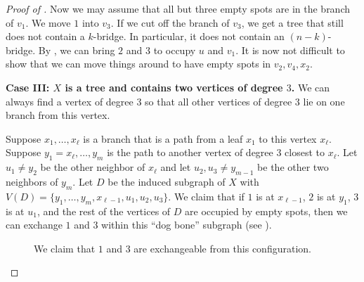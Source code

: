 \documentclass{mystyle}
\begin{document}
\begin{proof}[Proof of ]
    Now we may assume that all but three empty spots are in the branch of $v_1$. We move $1$ into $v_3$. If we cut off the branch of $v_3$, we get a tree that still does not contain a $k$-bridge. In particular, it does not contain an $(n - k)$-bridge. By , we can bring $2$ and $3$ to occupy $u$ and $v_1$. It is now not difficult to show that we can move things around to have empty spots in $v_2, v_4, x_2$. 
    
    \textbf{Case III: $X$ is a tree and contains two vertices of degree $3$.} We can always find a vertex of degree $3$ so that all other vertices of degree $3$ lie on one branch from this vertex. 
    
    Suppose $x_1, \ldots, x_\ell$ is a branch that is a path from a leaf $x_1$ to this vertex $x_\ell$. Suppose $y_1 = x_\ell, \ldots, y_m$ is the path to another vertex of degree $3$ closest to $x_\ell$. Let $u_1 \neq y_2$ be the other neighbor of $x_\ell$ and let $u_2, u_3 \neq y_{m - 1}$ be the other two neighbors of $y_m$. Let $D$ be the induced subgraph of $X$ with $V(D) = \{y_1, \ldots, y_m, x_{\ell -1}, u_1, u_2, u_3\}$. We claim that if $1$ is at $x_{\ell -1}$, $2$ is at $y_1$, $3$ is at $u_1$, and the rest of the vertices of $D$ are occupied by empty spots, then we can exchange $1$ and $3$ within this ``dog bone'' subgraph (see ). 

    \begin{figure}[ht]
            \centering
            \caption{We claim that $1$ and $3$ are exchangeable from this configuration.}
            \label{fig_16}
    \end{figure}


\end{proof}
\end{document}

